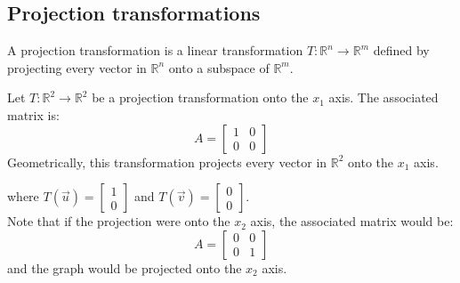 \subsection{Projection transformations}
\begin{definition}
    A projection transformation is a linear transformation $T: \mathbb{R}^n \to \mathbb{R}^m$ defined by projecting every vector in $\mathbb{R}^n$ onto a subspace of $\mathbb{R}^m$.
\end{definition}
\begin{eg}
    Let $T: \mathbb{R}^2 \to \mathbb{R}^2$ be a projection transformation onto the $x_1$ axis. The associated matrix is:
    \[
        A = \begin{bmatrix} 1 & 0 \\ 0 & 0 \end{bmatrix}
    \]
    Geometrically, this transformation projects every vector in $\mathbb{R}^2$ onto the $x_1$ axis.
    \begin{center}
    \end{center}
    where $T(\vec{u}) = \begin{bmatrix} 1 \\ 0 \end{bmatrix}$ and $T(\vec{v}) = \begin{bmatrix} 0 \\ 0 \end{bmatrix}$. \\
    Note that if the projection were onto the $x_2$ axis, the associated matrix would be:
    \[
        A = \begin{bmatrix} 0 & 0 \\ 0 & 1 \end{bmatrix}
    \]
    and the graph would be projected onto the $x_2$ axis.
\end{eg}


